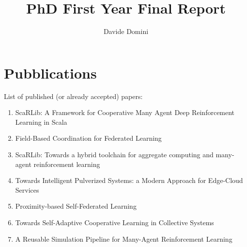\documentclass[runningheads]{llncs}
\begin{document}
%
\title{PhD First Year Final Report}
%
%
\author{Davide Domini}
%
%
%
\maketitle              %
%

%
%
%
\section{Pubblications}
List of published (or already accepted) papers:
\begin{enumerate}
    \item ScaRLib: A Framework for Cooperative Many Agent Deep Reinforcement Learning in Scala~\cite{DBLP:conf/coordination/DominiCAV23}
    \item Field-Based Coordination for Federated Learning~\cite{DBLP:conf/coordination/DominiAEV24}
    \item ScaRLib: Towards a hybrid toolchain for aggregate computing and many-agent reinforcement learning~\cite{DBLP:journals/scp/DominiCAV24}
    \item Towards Intelligent Pulverized Systems: a Modern Approach for Edge-Cloud Services~\cite{DBLP:conf/woa/DominiFAV24}
    \item Proximity-based Self-Federated Learning~\cite{DBLP:conf/acsos/DominiFAVE24}
    \item Towards Self-Adaptive Cooperative Learning in Collective Systems~\cite{DBLP:conf/acsos/Domini24}
    \item A Reusable Simulation Pipeline for Many-Agent Reinforcement Learning~\cite{DBLP:conf/dsrt/DominiAPV24}
\end{enumerate}
\end{document}
